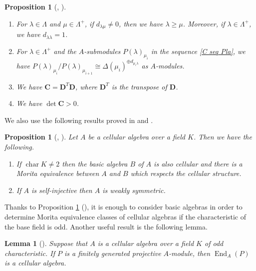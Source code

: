 \documentclass[12pt]{amsart}
\newtheorem{lem}[thm]{Lemma}
\newtheorem{prop}[thm]{Proposition}
\numberwithin{equation}{thm}
\newcommand\bC{\mathbf C}
\newcommand\bD{\mathbf D}
\newcommand\la{\lambda}
\newcommand\D{\Delta}
\newcommand\vL{\varLambda}
\newcommand\End{\operatorname{End}}
\newcommand\cha{\operatorname{char}}
\newcounter{ichi}
\newcommand{\roi}{\roman{ichi}}
\newcounter{ni}
\begin{document}

\begin{prop}[{\cite[Proposition 3.6, Theorem 3.7]{GL}, \cite[Proposition 1.2]{KX3}}]\ 
\label{C Prop decom matrix}
\begin{enumerate} 
\item 
For $\la \in \vL$ and $\mu \in \vL^+$, 
if $d_{\la\mu} \not=0$, then we have $\la \geq \mu$. 
Moreover, if $\la \in \vL^+$, we have $d_{\la \la} =1$. 

\item 
For $\la \in \vL^+$ and the $A$-submodules $P(\la)_{\mu_i}$ in the sequence \eqref{C seq Pla}, we have 
$P(\la)_{\mu_i}/ P(\la)_{\mu_{i+1}} \cong \D(\mu_i)^{\oplus d_{\mu_i \la}}$ 
as $A$-modules. 

\item 
We have 
$\bC= \bD^T \bD$, where $\bD^T$ is the transpose of $\bD$. 

\item 
We have $\det \bC >0$. 

\end{enumerate}
\end{prop}


We also use the following results proved in \cite{KX2} and \cite{KX4}. 

\begin{prop}[{\cite[Theorem 8.1]{KX2}, \cite[Theorem 1.1]{KX4}}] 
\label{C Prop Morita equiv} 
Let $A$ be a cellular algebra over a field $K$. 
Then we have the following. 
\begin{enumerate} 
\item
If $\cha K \not=2$ then the basic algebra $B$ of $A$ is also cellular and 
there is a Morita equivalence between $A$ and $B$ which respects the cellular structure.

\item 
If $A$ is self-injective then $A$ is weakly symmetric. 

\end{enumerate}
\end{prop}


Thanks to Proposition \ref{C Prop Morita equiv} (\roi), 
it is enough to consider basic algebras in order to determine Morita equivalence classes of cellular algebras  
if the characteristic of the base field is odd.  
Another useful result is the following lemma. 

\begin{lem}[{\cite[Corollary 8.3]{KX2}}]
\label{C Lem idem}
Suppose that $A$ is a cellular algebra over a field $K$ of odd characteristic. If $P$ is a finitely generated projective $A$-module, 
then $\End_A(P)$ is a cellular algebra.
\end{lem}
\end{document}
